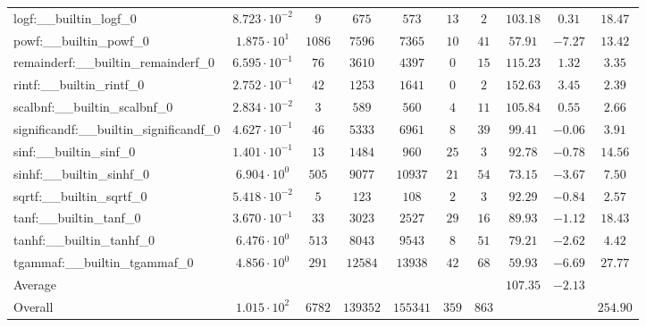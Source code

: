 \begin{tabular}{|l|c|c|c|c|c|c|c|c|c|}
logf:\_\_builtin\_logf\_0                 & $ 8.723 \cdot 10^{-2} $ & $ 9      $ & $ 675    $ & $ 573    $ & $ 13  $ & $ 2   $ & $ 103.18      $ & $ 0.31    $ & $ 18.47   $ \\
powf:\_\_builtin\_powf\_0                 & $ 1.875 \cdot 10^{1}  $ & $ 1086   $ & $ 7596   $ & $ 7365   $ & $ 10  $ & $ 41  $ & $ 57.91       $ & $ -7.27   $ & $ 13.42   $ \\
remainderf:\_\_builtin\_remainderf\_0     & $ 6.595 \cdot 10^{-1} $ & $ 76     $ & $ 3610   $ & $ 4397   $ & $ 0   $ & $ 15  $ & $ 115.23      $ & $ 1.32    $ & $ 3.35    $ \\
rintf:\_\_builtin\_rintf\_0               & $ 2.752 \cdot 10^{-1} $ & $ 42     $ & $ 1253   $ & $ 1641   $ & $ 0   $ & $ 2   $ & $ 152.63      $ & $ 3.45    $ & $ 2.39    $ \\
scalbnf:\_\_builtin\_scalbnf\_0           & $ 2.834 \cdot 10^{-2} $ & $ 3      $ & $ 589    $ & $ 560    $ & $ 4   $ & $ 11  $ & $ 105.84      $ & $ 0.55    $ & $ 2.66    $ \\
significandf:\_\_builtin\_significandf\_0 & $ 4.627 \cdot 10^{-1} $ & $ 46     $ & $ 5333   $ & $ 6961   $ & $ 8   $ & $ 39  $ & $ 99.41       $ & $ -0.06   $ & $ 3.91    $ \\
sinf:\_\_builtin\_sinf\_0                 & $ 1.401 \cdot 10^{-1} $ & $ 13     $ & $ 1484   $ & $ 960    $ & $ 25  $ & $ 3   $ & $ 92.78       $ & $ -0.78   $ & $ 14.56   $ \\
sinhf:\_\_builtin\_sinhf\_0               & $ 6.904 \cdot 10^{0}  $ & $ 505    $ & $ 9077   $ & $ 10937  $ & $ 21  $ & $ 54  $ & $ 73.15       $ & $ -3.67   $ & $ 7.50    $ \\
sqrtf:\_\_builtin\_sqrtf\_0               & $ 5.418 \cdot 10^{-2} $ & $ 5      $ & $ 123    $ & $ 108    $ & $ 2   $ & $ 3   $ & $ 92.29       $ & $ -0.84   $ & $ 2.57    $ \\
tanf:\_\_builtin\_tanf\_0                 & $ 3.670 \cdot 10^{-1} $ & $ 33     $ & $ 3023   $ & $ 2527   $ & $ 29  $ & $ 16  $ & $ 89.93       $ & $ -1.12   $ & $ 18.43   $ \\
tanhf:\_\_builtin\_tanhf\_0               & $ 6.476 \cdot 10^{0}  $ & $ 513    $ & $ 8043   $ & $ 9543   $ & $ 8   $ & $ 51  $ & $ 79.21       $ & $ -2.62   $ & $ 4.42    $ \\
tgammaf:\_\_builtin\_tgammaf\_0           & $ 4.856 \cdot 10^{0}  $ & $ 291    $ & $ 12584  $ & $ 13938  $ & $ 42  $ & $ 68  $ & $ 59.93       $ & $ -6.69   $ & $ 27.77   $ \\
\hline
Average                                   & $                     $ & $        $ & $        $ & $        $ & $     $ & $     $ & $ 107.35      $ & $ -2.13   $ & $         $ \\
\hline
Overall                                   & $ 1.015 \cdot 10^{2}  $ & $ 6782   $ & $ 139352 $ & $ 155341 $ & $ 359 $ & $ 863 $ & $             $ & $         $ & $ 254.90  $ \\
\hline
\end{tabular}
